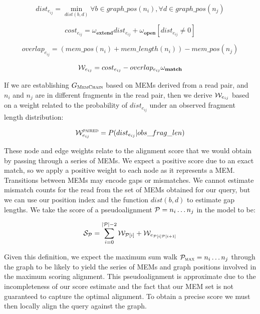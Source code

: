 \begin{equation}
  dist_{e_{ij}} = \min_{dist(b,d)} \forall b \in graph\_pos(n_i), \forall d \in graph\_pos(n_j)
\end{equation}

\begin{equation}
  cost_{e_{ij}} = \omega_\textbf{extend} dist_{e_{ij}} + \omega_\textbf{open} [dist_{e_{ij}} \ne 0]
\end{equation}

\begin{equation}
  overlap_{e_{ij}} = (mem\_pos(n_i) + mem\_length(n_i)) - mem\_pos(n_j)
\end{equation}

\begin{equation}
  {\cal W}_{e_{ij}} = cost_{e_{ij}} - overlap_{e_{ij}} \omega_\textbf{match}
\end{equation}

If we are establishing $G_\textsc{MemChain}$ based on MEMs derived from a read pair, and $n_i$ and $n_j$ are in different fragments in the read pair, then we derive ${\cal W}_{e_{ij}}$ based on a weight related to the probability of $dist_{e_{ij}}$ under an observed fragment length distribution:

\begin{equation}
  {\cal W}_{e_{ij}}^{\textsc{paired}} = P(dist_{e_{ij}} | obs\_frag\_len)
\end{equation}

These node and edge weights relate to the alignment score that we would obtain by passing through a series of MEMs.
We expect a positive score due to an exact match, so we apply a positive weight to each node as it represents a MEM.
Transitions between MEMs may encode gaps or mismatches.
We cannot estimate mismatch counts for the read from the set of MEMs obtained for our query, but we can use our position index and the function $dist(b,d)$ to estimate gap lengths.
We take the score of a pseudoalignment ${\cal P} = n_i \ldots n_j$ in the model to be:

\begin{equation}
  {\cal S}_{\cal P} = \sum_{i = 0}^{|{\cal P}|-2} {\cal W}_{{\cal P}[i]} + {\cal W}_{e_{{\cal P}[i]{\cal P}[i+1]}}
\end{equation}

Given this definition, we expect the maximum sum walk ${\cal P}_\textsc{max} = n_i \ldots n_j$ through the graph to be likely to yield the series of MEMs and graph positions involved in the maximum scoring alignment.
This pseudoalignment is approximate due to the incompleteness of our score estimate and the fact that our MEM set is not guaranteed to capture the optimal alignment.
To obtain a precise score we must then locally align the query against the graph.

